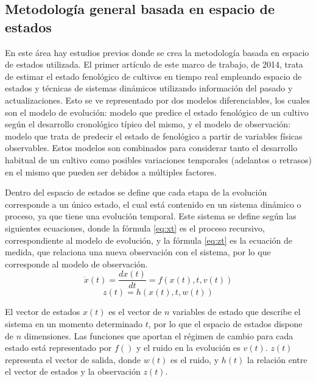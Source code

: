 \subsection{Metodología general basada en espacio de estados}
\par En este área hay estudios previos donde se crea la metodología basada en espacio de estados utilizada. El primer artículo \cite{Juanma2014} de este marco de trabajo, de 2014, trata de estimar el estado fenológico de cultivos en tiempo real empleando espacio de estados y técnicas de sistemas dinámicos utilizando información del pasado y actualizaciones. Esto se ve representado por dos modelos diferenciables, los cuales son el modelo de evolución: modelo que predice el estado fenológico de un cultivo según el desarrollo cronológico típico del mismo, y el modelo de observación: modelo que trata de predecir el estado de fenológico a partir de variables físicas observables. Estos modelos son combinados para considerar tanto el desarrollo habitual de un cultivo como posibles variaciones temporales (adelantos o retrasos) en el mismo que pueden ser debidos a múltiples factores. 
\\
\par Dentro del espacio de estados se define que cada etapa de la evolución corresponde a un único estado, el cual está contenido en un sistema dinámico o proceso, ya que tiene una evolución temporal. Este sistema se define según las siguientes ecuaciones, donde la fórmula \ref{eq:xt} es el proceso recursivo, correspondiente al modelo de evolución, y la fórmula \ref{eq:zt} es la ecuación de medida, que relaciona una nueva observación con el sistema, por lo que corresponde al modelo de observación.
\\
\begin{equation} \label{eq:xt}
\dot{x}(t) = \frac{dx(t)}{dt}=f(x(t),t,v(t))
\end{equation}
\begin{equation} \label{eq:zt}
z(t) = h(x(t),t,w(t))
\end{equation}
\par El vector de estados $x(t)$ es el vector de $n$ variables de estado que describe el sistema en un momento determinado $t$, por lo que el espacio de estados dispone de $n$ dimensiones. Las funciones que aportan el régimen de cambio para cada estado está representado por $f()$ y el ruido en la evolución es $v(t)$. $z(t)$ representa el vector de salida, donde $w(t)$ es el ruido, y $h(t)$ la relación entre el vector de estados y la observación $z(t)$.
\\
